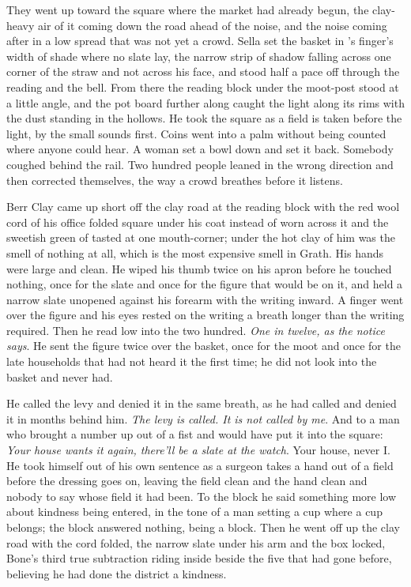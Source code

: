 They went up  toward the square where the market had already begun, the clay-heavy air of it coming down the road ahead of the noise, and the noise coming after in a low spread that was not yet a crowd. Sella set the basket in 's finger's width of shade where no slate lay, the narrow strip of shadow falling across one corner of the straw and not across his face, and stood half a pace off through the reading and the bell. From there the reading block under the moot-post stood at a little angle, and the pot board further along caught the light along its rims with the dust standing in the hollows. He took the square as a field is taken before the light, by the small sounds first. Coins went into a palm without being counted where anyone could hear. A woman set a bowl down and set it back. Somebody coughed behind the rail. Two hundred people leaned in the wrong direction and then corrected themselves, the way a crowd breathes before it listens.

Berr Clay came up short off the clay road at the reading block with the red wool cord of his office folded square under his coat instead of worn across it and the sweetish green of tasted  at one mouth-corner; under the hot clay of him was the smell of nothing at all, which is the most expensive smell in Grath. His hands were large and clean. He wiped his thumb twice on his apron before he touched nothing, once for the slate and once for the figure that would be on it, and held a narrow slate unopened against his forearm with the writing inward. A finger went over the figure and his eyes rested on the writing a breath longer than the writing required. Then he read low into the two hundred. \emph{One in twelve, as the notice says}. He sent the figure twice over the basket, once for the moot and once for the late households that had not heard it the first time; he did not look into the basket and never had.

He called the levy and denied it in the same breath, as he had called and denied it in months behind him. \emph{The levy is called. It is not called by me}. And to a man who brought a number up out of a fist and would have put it into the square: \emph{Your house wants it again, there'll be a slate at the watch}. Your house, never I. He took himself out of his own sentence as a surgeon takes a hand out of a field before the dressing goes on, leaving the field clean and the hand clean and nobody to say whose field it had been. To the block he said something more low about kindness being entered, in the tone of a man setting a cup where a cup belongs; the block answered nothing, being a block. Then he went off up the clay road with the cord folded, the narrow slate under his arm and the box locked, Bone's third true subtraction riding inside beside the five that had gone before, believing he had done the district a kindness.

